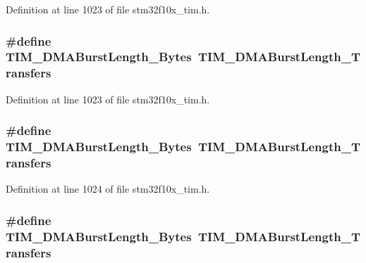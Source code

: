Definition at line 1023 of file stm32f10x\+\_\+tim.\+h.

\subsubsection[{\texorpdfstring{T\+I\+M\+\_\+\+D\+M\+A\+Burst\+Length\+\_\+4\+Bytes}{TIM_DMABurstLength_4Bytes}}]{\setlength{\rightskip}{0pt plus 5cm}\#define T\+I\+M\+\_\+\+D\+M\+A\+Burst\+Length\+\_\+Bytes~{\bf T\+I\+M\+\_\+\+D\+M\+A\+Burst\+Length\+\_\+Transfers}}\hypertarget{group___t_i_m___legacy_ga620ce560a1d7a6d6769cacd2a2ead48d}{}\label{group___t_i_m___legacy_ga620ce560a1d7a6d6769cacd2a2ead48d}


Definition at line 1023 of file stm32f10x\+\_\+tim.\+h.

\subsubsection[{\texorpdfstring{T\+I\+M\+\_\+\+D\+M\+A\+Burst\+Length\+\_\+5\+Bytes}{TIM_DMABurstLength_5Bytes}}]{\setlength{\rightskip}{0pt plus 5cm}\#define T\+I\+M\+\_\+\+D\+M\+A\+Burst\+Length\+\_\+Bytes~{\bf T\+I\+M\+\_\+\+D\+M\+A\+Burst\+Length\+\_\+Transfers}}\hypertarget{group___t_i_m___legacy_gaf9ac4a4cfd3dcfb7ba859898e702c881}{}\label{group___t_i_m___legacy_gaf9ac4a4cfd3dcfb7ba859898e702c881}


Definition at line 1024 of file stm32f10x\+\_\+tim.\+h.

\subsubsection[{\texorpdfstring{T\+I\+M\+\_\+\+D\+M\+A\+Burst\+Length\+\_\+5\+Bytes}{TIM_DMABurstLength_5Bytes}}]{\setlength{\rightskip}{0pt plus 5cm}\#define T\+I\+M\+\_\+\+D\+M\+A\+Burst\+Length\+\_\+Bytes~{\bf T\+I\+M\+\_\+\+D\+M\+A\+Burst\+Length\+\_\+Transfers}}\hypertarget{group___t_i_m___legacy_gaf9ac4a4cfd3dcfb7ba859898e702c881}{}\label{group___t_i_m___legacy_gaf9ac4a4cfd3dcfb7ba859898e702c881}


